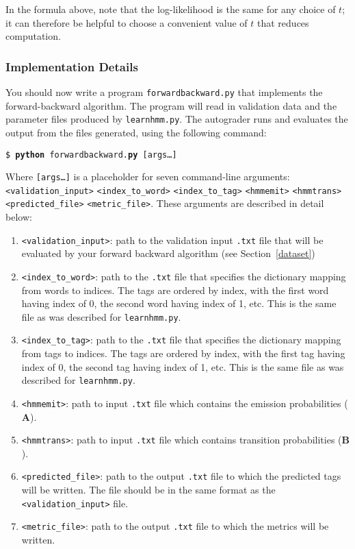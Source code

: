 \documentclass[11pt,addpoints,answers]{exam}
\begin{document}
In the formula above, note that the log-likelihood is the same for any choice of $t$; it can therefore be helpful to choose a convenient value of $t$ that reduces computation.

\clearpage
\subsubsection{Implementation Details}

You should now write a program \texttt{forwardbackward.py} that implements the forward-backward algorithm. The program will read in validation data and the parameter files produced by \texttt{learnhmm.py}. The autograder runs and evaluates the output from the files generated, using the following command:

\begin{tabbing}
\=\texttt{\$ \textbf{python} forwardbackward.\textbf{py} [args\dots]}\\
\end{tabbing}

Where \texttt{[args\dots]} is a placeholder for seven command-line arguments:\texttt{<validation\_input>} \texttt{<index\_to\_word>} \texttt{<index\_to\_tag>} \texttt{<hmmemit>} \texttt{<hmmtrans>} \texttt{<predicted\_file>} \texttt{<metric\_file>}. These arguments are described in detail below:
\begin{enumerate}
    \item \texttt{<validation\_input>}: path to the validation input \texttt{.txt} file that will be evaluated by your forward backward algorithm (see Section~\ref{dataset})
    \item \texttt{<index\_to\_word>}: path to the \texttt{.txt} file that specifies the dictionary mapping from words to indices. The tags are ordered by index, with the first word having index of 0, the second word having index of 1, etc. This is the same file as was described for \texttt{learnhmm.py}.
    \item \texttt{<index\_to\_tag>}: path to the \texttt{.txt} file that specifies the dictionary mapping from tags to indices. The tags are ordered by index, with the first tag having index of 0, the second tag having index of 1, etc. This is the same file as was described for \texttt{learnhmm.py}.
    \item \texttt{<hmmemit>}: path to input \texttt{.txt} file which contains the emission probabilities ($\mathbf A$).
    \item \texttt{<hmmtrans>}: path to input \texttt{.txt} file which contains transition probabilities ($\mathbf B$).
    \item \texttt{<predicted\_file>}: path to the output \texttt{.txt} file to which the predicted tags will be written. The file should be in the same format as the \texttt{<validation\_input>} file. 
    \item \texttt{<metric\_file>}: path to the output \texttt{.txt} file to which the metrics will be written. 
\end{enumerate}
\end{document}
